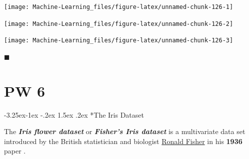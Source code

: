 \documentclass[]{book}
\makeatletter
\newenvironment{Shaded}{\begin{snugshade}}{\end{snugshade}}
\newcommand{\KeywordTok}[1]{\textcolor[rgb]{0.13,0.29,0.53}{\textbf{#1}}}
\newcommand{\DataTypeTok}[1]{\textcolor[rgb]{0.13,0.29,0.53}{#1}}
\newcommand{\StringTok}[1]{\textcolor[rgb]{0.31,0.60,0.02}{#1}}
\newcommand{\CommentTok}[1]{\textcolor[rgb]{0.56,0.35,0.01}{\textit{#1}}}
\newcommand{\OtherTok}[1]{\textcolor[rgb]{0.56,0.35,0.01}{#1}}
\newcommand{\NormalTok}[1]{#1}
\renewcommand\subsection{\@startsection{subsection}{2}{\z@}%
                                     {-3.25ex\@plus -1ex \@minus -.2ex}%
                                     {1.5ex \@plus .2ex}%
                                     {\normalfont\large\bfseries\color{Violet}}}
\theoremstyle{definition}
\theoremstyle{definition}
\theoremstyle{definition}
\theoremstyle{remark}
\makeatother
\begin{document}
\begin{center}\texttt{[image: Machine-Learning\_files/figure-latex/unnamed-chunk-126-1]} \end{center}

\begin{Shaded}
\end{Shaded}

\begin{center}\texttt{[image: Machine-Learning\_files/figure-latex/unnamed-chunk-126-2]} \end{center}

\begin{Shaded}
\end{Shaded}

\begin{center}\texttt{[image: Machine-Learning\_files/figure-latex/unnamed-chunk-126-3]} \end{center}

◼

\chapter*{PW 6}\label{pw-6}

\subsection*{The Iris Dataset}\label{the-iris-dataset}

The \textbf{\emph{Iris flower dataset}} or \textbf{\emph{Fisher's Iris
dataset}} is a multivariate data set introduced by the British
statistician and biologist
\href{https://en.wikipedia.org/wiki/Ronald_Fisher}{Ronald Fisher} in his
\textbf{1936} paper \citep{Fisher1936}.
\end{document}
